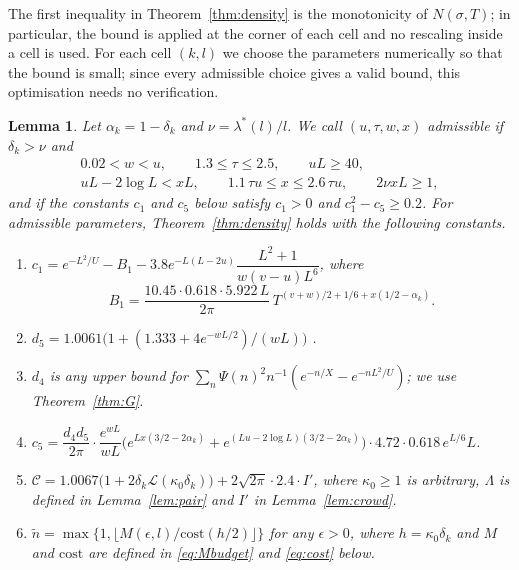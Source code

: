 \documentclass[11pt]{amsart}
\numberwithin{equation}{section}
\newtheorem{lemma}[theorem]{Lemma}
\theoremstyle{definition}
\theoremstyle{remark}
\begin{document}
The first inequality in Theorem~\ref{thm:density} is the monotonicity of $N(\sigma, T)$; in particular, the bound is applied at the corner of each cell and no rescaling inside a cell is used.
For each cell $(k, l)$ we choose the parameters numerically so that the bound is small; since every admissible choice gives a valid bound, this optimisation needs no verification.

\begin{lemma}\label{lem:D}
Let $\alpha_k = 1 - \delta_k$ and $\nu = \lambda^*(l)/l$.
We call $(u, \tau, w, x)$ admissible if $\delta_k > \nu$ and
\begin{gather*}
0.02 < w < u, \qquad 1.3 \leq \tau \leq 2.5, \qquad uL \geq 40,\\
uL - 2\log L < xL, \qquad 1.1\,\tau u \leq x \leq 2.6\,\tau u, \qquad 2\nu xL \geq 1,
\end{gather*}
and if the constants $c_1$ and $c_5$ below satisfy $c_1 > 0$ and $c_1^2 - c_5 \geq 0.2$.
For admissible parameters, Theorem~\ref{thm:density} holds with the following constants.
\begin{enumerate}
\item[(i)] $c_1 = e^{-L^2/U} - B_1 - 3.8e^{-L(L-2u)}\dfrac{L^2 + 1}{w(v - u)L^6}$, where
\[
B_1 = \frac{10.45\cdot0.618\cdot5.922\,L}{2\pi}\,T^{(v+w)/2 + 1/6 + x(1/2 - \alpha_k)}.
\]
\item[(ii)] $d_5 = 1.0061\big(1 + (1.333 + 4e^{-wL/2})/(wL)\big)$ \cite[Lemma~4.3]{Bellotti}.
\item[(iii)] $d_4$ is any upper bound for $\sum_n\Psi(n)^2n^{-1}(e^{-n/X} - e^{-nL^2/U})$; we use Theorem~\ref{thm:G}.
\item[(iv)] $c_5 = \dfrac{d_4d_5}{2\pi}\cdot\dfrac{e^{wL}}{wL}\Big(e^{Lx(3/2 - 2\alpha_k)} + e^{(Lu - 2\log L)(3/2 - 2\alpha_k)}\Big)\cdot4.72\cdot0.618\,e^{L/6}L$.
\item[(v)] $\mathcal C = 1.0067\big(1 + 2\delta_k\mathcal L(\kappa_0\delta_k)\big) + 2\sqrt{2\pi}\cdot2.4\cdot I'$, where $\kappa_0 \geq 1$ is arbitrary, $\Lambda$ is defined in Lemma~\ref{lem:pair} and $I'$ in Lemma~\ref{lem:crowd}.
\item[(vi)] $\tilde n = \max\{1, \lfloor M(\epsilon, l)/\mathrm{cost}(h/2)\rfloor\}$ for any $\epsilon > 0$, where $h = \kappa_0\delta_k$ and $M$ and $\mathrm{cost}$ are defined in \eqref{eq:Mbudget} and \eqref{eq:cost} below.
\end{enumerate}
\end{lemma}
\end{document}
